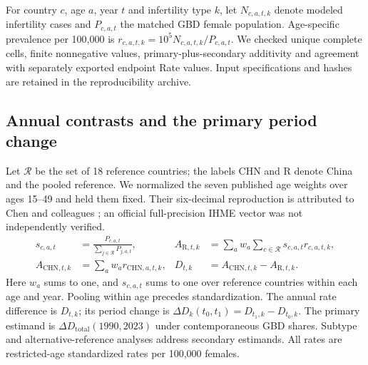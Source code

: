 \documentclass[11pt,a4paper]{article}
\begin{document}
For country $c$, age $a$, year $t$ and infertility type $k$, let $N_{c,a,t,k}$ denote modeled infertility cases and $P_{c,a,t}$ the matched GBD female population. Age-specific prevalence per 100,000 is $r_{c,a,t,k}=10^5N_{c,a,t,k}/P_{c,a,t}$. We checked unique complete cells, finite nonnegative values, primary-plus-secondary additivity and agreement with separately exported endpoint Rate values. Input specifications and hashes are retained in the reproducibility archive.

\subsection{Annual contrasts and the primary period change}
Let $\mathcal{R}$ be the set of 18 reference countries; the labels $\mathrm{CHN}$ and $\mathrm{R}$ denote China and the pooled reference. We normalized the seven published age weights over ages 15--49 and held them fixed. Their six-decimal reproduction is attributed to Chen and colleagues \citep{chen}; an official full-precision IHME vector was not independently verified.
\begin{align}
 s_{c,a,t}&=\frac{P_{c,a,t}}{\sum_{j\in\mathcal{R}}P_{j,a,t}}, &
 A_{\mathrm{R},t,k}&=\sum_a w_a\sum_{c\in\mathcal{R}}s_{c,a,t}r_{c,a,t,k},\\
 A_{\mathrm{CHN},t,k}&=\sum_a w_ar_{\mathrm{CHN},a,t,k}, &
 D_{t,k}&=A_{\mathrm{CHN},t,k}-A_{\mathrm{R},t,k}.
\end{align}
Here $w_a$ sums to one, and $s_{c,a,t}$ sums to one over reference countries within each age and year. Pooling within age precedes standardization. The annual rate difference is $D_{t,k}$; its period change is $\Delta D_k(t_0,t_1)=D_{t_1,k}-D_{t_0,k}$. The primary estimand is $\Delta D_{\mathrm{total}}(1990,2023)$ under contemporaneous GBD shares. Subtype and alternative-reference analyses address secondary estimands. All rates are restricted-age standardized rates per 100,000 females.
\end{document}
